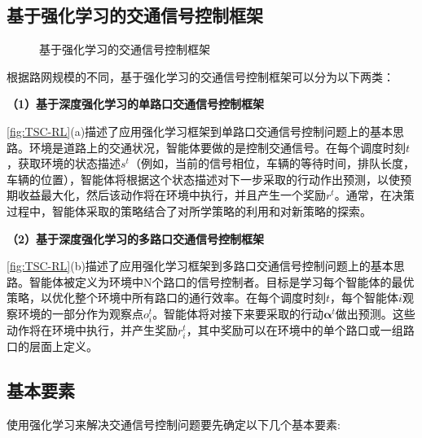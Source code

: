 \subsection{基于强化学习的交通信号控制框架}
\begin{figure}[t]
    \quad
    \caption{基于强化学习的交通信号控制框架}
    \label{fig:TSC-RL}
  \end{figure}
根据路网规模的不同，基于强化学习的交通信号控制框架可以分为以下两类：

\textbf{（1）基于深度强化学习的单路口交通信号控制框架}

\autoref{fig:TSC-RL}(a)描述了应用强化学习框架到单路口交通信号控制问题上的基本思路。环境是道路上的交通状况，智能体要做的是控制交通信号。在每个调度时刻$t$，获取环境的状态描述$s^t$（例如，当前的信号相位，车辆的等待时间，排队长度，车辆的位置），智能体将根据这个状态描述对下一步采取的行动作出预测，以使预期收益最大化，然后该动作将在环境中执行，并且产生一个奖励$r^t$。通常，在决策过程中，智能体采取的策略结合了对所学策略的利用和对新策略的探索。

\textbf{（2）基于深度强化学习的多路口交通信号控制框架}

\autoref{fig:TSC-RL}(b)描述了应用强化学习框架到多路口交通信号控制问题上的基本思路。智能体被定义为环境中N个路口的信号控制者。目标是学习每个智能体的最优策略，以优化整个环境中所有路口的通行效率。在每个调度时刻$t$，每个智能体$i$观察环境的一部分作为观察点$o_i^t$。智能体将对接下来要采取的行动$\mathbf{\alpha}^t$做出预测。这些动作将在环境中执行，并产生奖励$r_i^t$，其中奖励可以在环境中的单个路口或一组路口的层面上定义。

\subsection{基本要素}
使用强化学习来解决交通信号控制问题要先确定以下几个基本要素:

